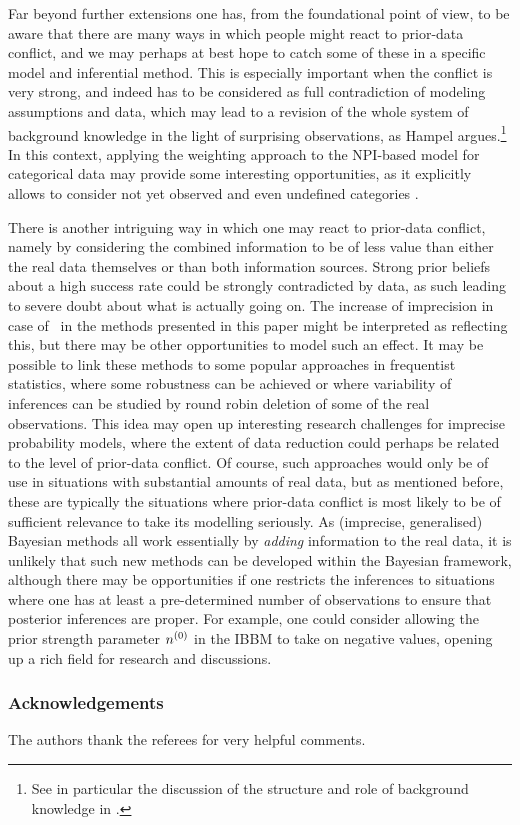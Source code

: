 Far beyond further extensions %
one has, from the foundational point of view, to be aware that there are
many ways in which people might react to prior-data conflict, and we
may perhaps at best hope to catch some of these in a specific
model and inferential method.
This is especially important when the conflict is very strong, and
indeed has to be considered as full contradiction of modeling
assumptions and data, which may lead to a revision of the whole
system of background knowledge in the light of surprising
observations, as Hampel argues.\footnote{See in particular the discussion of the
structure and role of background knowledge in \textcite{2009:hampel:knowledge}.}
In this context, applying the weighting approach to the NPI-based model
for categorical data \parencite{2009:Coolen:Augustin} may provide some
interesting opportunities, as it explicitly allows to consider not yet observed and
even undefined categories \parencite{2005:Coolen:Augustin}.

There is another intriguing way in which one may react to prior-data
conflict, namely by considering the combined information to be of
less value than either the real data themselves or than both
information sources. Strong prior beliefs about
a high success rate could be strongly contradicted by data, as such
leading to severe doubt about what is actually going on. The increase of
imprecision in case of \pdc\ in the methods presented in this paper
might be interpreted as reflecting this, but there may be other
opportunities to model such an effect. It may be possible to link these
methods to some popular approaches in frequentist statistics, where some robustness
can be achieved or where variability of inferences can be studied by
round robin deletion of some of the real observations. %
This idea may open up interesting research challenges for imprecise probability
models, where the extent of data reduction could perhaps be
related to the level of prior-data conflict. Of course, such
approaches would only be of use in situations with substantial
amounts of real data, but as mentioned before, these are typically
the situations where prior-data conflict is most likely to be of
sufficient relevance to take its modelling seriously. As (imprecise,
generalised) Bayesian methods all work essentially by \emph{adding}
information to the real data, it is unlikely that such new methods
can be developed within the Bayesian framework, although there may
be opportunities if one restricts the inferences to situations where
one has at least a pre-determined number of observations to ensure
that posterior inferences are proper. For example, one could
consider allowing the prior strength parameter
$n^{(0)}$ in the IBBM to take on negative values, opening up a rich
field for research and discussions.


\subsubsection*{Acknowledgements}%

The authors thank the referees for very helpful comments.




